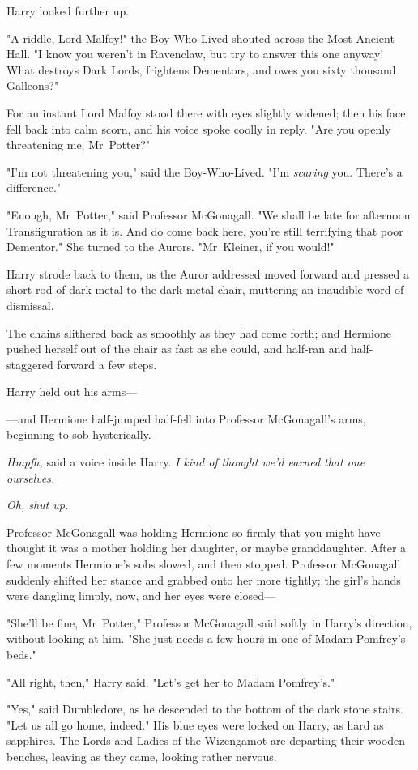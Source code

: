 Harry looked further up.

"A riddle, Lord Malfoy!" the Boy-Who-Lived shouted across the Most Ancient
Hall. "I know you weren't in Ravenclaw, but try to answer this one anyway! What
destroys Dark Lords, frightens Dementors, and owes you sixty thousand Galleons?"

For an instant Lord Malfoy stood there with eyes slightly widened; then his
face fell back into calm scorn, and his voice spoke coolly in reply. "Are you
openly threatening me, Mr~Potter?"

"I'm not threatening you," said the Boy-Who-Lived. "I'm \emph{scaring} you.
There's a difference."

"Enough, Mr~Potter," said Professor McGonagall. "We shall be late for
afternoon Transfiguration as it is. And do come back here, you're still
terrifying that poor Dementor." She turned to the Aurors. "Mr~Kleiner, if you
would!"

Harry strode back to them, as the Auror addressed moved forward and pressed a
short rod of dark metal to the dark metal chair, muttering an inaudible word of
dismissal.

The chains slithered back as smoothly as they had come forth; and Hermione
pushed herself out of the chair as fast as she could, and half-ran and
half-staggered forward a few steps.

Harry held out his arms—

—and Hermione half-jumped half-fell into Professor McGonagall's arms,
beginning to sob hysterically.

\emph{Hmpfh,} said a voice inside Harry. \emph{I kind of thought we'd earned
that one ourselves.}

\emph{Oh, shut up.}

Professor McGonagall was holding Hermione so firmly that you might have thought
it was a mother holding her daughter, or maybe granddaughter. After a few
moments Hermione's sobs slowed, and then stopped. Professor McGonagall suddenly
shifted her stance and grabbed onto her more tightly; the girl's hands were
dangling limply, now, and her eyes were closed—

"She'll be fine, Mr~Potter," Professor McGonagall said softly in Harry's
direction, without looking at him. "She just needs a few hours in one of Madam
Pomfrey's beds."

"All right, then," Harry said. "Let's get her to Madam Pomfrey's."

"Yes," said Dumbledore, as he descended to the bottom of the dark stone stairs.
"Let us all go home, indeed." His blue eyes were locked on Harry, as hard as
sapphires.
\later
The Lords and Ladies of the Wizengamot are departing their wooden benches,
leaving as they came, looking rather nervous.

